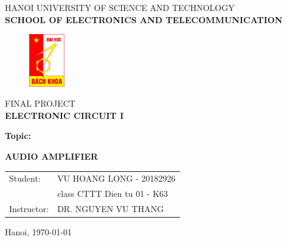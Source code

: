 \begin{titlepage}
\begin{center}
\vspace{-12pt}  HANOI UNIVERSITY OF SCIENCE AND TECHNOLOGY \\
\textbf{\fontsize{13pt}{0pt}\selectfont SCHOOL OF ELECTRONICS AND TELECOMMUNICATION}
\vspace{0.5cm}
 \begin{figure}[H]
     \centering
     \includegraphics[width=1.53cm,height=2.26cm]{figure/logodhbk.png}
 \end{figure}
\vspace{1.5cm}
\fontsize{24pt}{0pt}\selectfont FINAL PROJECT\\
\vspace{12pt}
\textbf{\fontsize{32pt}{0pt}\selectfont ELECTRONIC CIRCUIT I}
\vspace{1.5cm}
\end{center}
\hspace{6pt}\textbf{\fontsize{14pt}{0pt}\selectfont Topic:}
\begin{center}
    \textbf{\fontsize{20pt}{0pt}\selectfont AUDIO AMPLIFIER}\\

\vspace{1.5cm}
\begin{table}[H]
    \centering
    \begin{tabular}{l l}
 \fontsize{14pt}{0pt}\selectfont Student:    & \fontsize{14pt}{0pt}\selectfont VU HOANG LONG - 20182926 \vspace{6pt} \\ 
     &\fontsize{14pt}{0pt}\selectfont class CTTT Dien tu 01 - K63 \vspace{6pt}\\
\fontsize{14pt}{0pt}\selectfont Instructor: & \fontsize{14pt}{0pt}\selectfont DR. NGUYEN VU THANG
\end{tabular}
\end{table}
\vspace{3.5cm}
 \fontsize{14pt}{0pt}\selectfont Hanoi, \today
\end{center}
\end{titlepage}
\cleardoublepage
